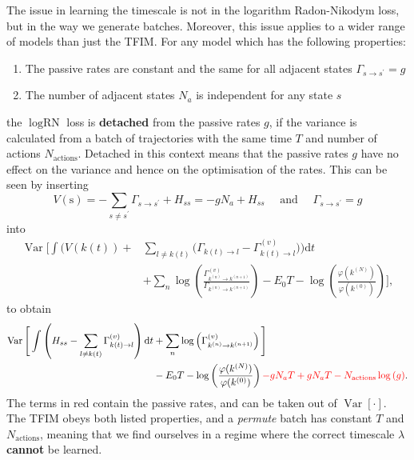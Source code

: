 The issue in learning the timescale is not in the logarithm Radon-Nikodym loss, but in the way we generate batches. Moreover, this issue applies to a wider range of models than just the TFIM. For any model which has the following properties:
\begin{enumerate}
	\item The passive rates are constant and the same for all adjacent states $\Gamma_{s \rightarrow s^{\prime}}=g$
	\item The number of adjacent states $N_a$ is independent for any state $s$
\end{enumerate}
the $\log \text{RN}$ loss is \textbf{detached} from the passive rates $g$, if the variance is calculated from a batch of trajectories with the same time $T$ and number of actions $N_{\text{actions}}$. Detached in this context means that the passive rates $g$ have no effect on the variance and hence on the optimisation of the rates. This can be seen by inserting 
\begin{equation}
	V(\mathrm{s})=-\sum_{s \neq s^{\prime}} \Gamma_{s \rightarrow s^{\prime}}+H_{s s}=-g N_a + H_{s s} \quad \text{ and } \quad \Gamma_{s \rightarrow s^{\prime}}=g
\end{equation}
into
\begin{equation}
	\begin{aligned}
			{\operatorname{Var}}\Bigg[\int\bigg(V(k(t))+&\sum_{l \neq k(t)}\bigg(\Gamma_{k(t) \rightarrow l}-\Gamma_{k(t) \rightarrow l}^{(v)}\bigg)\bigg) \mathrm{d} t \\
		&+\sum_{n} \log \left(\frac{\Gamma_{k^{(n)} \rightarrow k^{(n+1)}}^{(v)}}{\Gamma_{k^{(n)} \rightarrow k^{(n+1)}}}\right)-E_{0} T-\log \left(\frac{\varphi(k^{(N)})}{\varphi(k^{(0)})}\right)
		\Bigg],
	\end{aligned}
\end{equation}
to obtain
\begin{equation}
	\begin{aligned}
		\operatorname{Var}\Bigg[\int\left(H_{s s}-\sum_{l \neq k(t)}\Gamma_{k(t) \rightarrow l}^{(v)}\right)\mathrm{d} t 
		&+ \sum_{n} \log \left(\Gamma_{k^{(n)} \rightarrow k^{(n+1)}}^{(v)}\right)\Bigg] \\ &-E_{0} T -\log \left(\frac{\varphi(k^{(N)})}{\varphi(k^{(0)})}\right) \textcolor{red}{- gN_aT + gN_aT - N_{\text{actions}}\log{(g)}}.
	\end{aligned}
\end{equation}
The terms in red contain the passive rates, and can be taken out of $\operatorname{Var}[\cdot]$. The TFIM obeys both listed properties, and a \emph{permute} batch has constant $T$ and $N_{\text{actions}}$, meaning that we find ourselves in a regime where the correct timescale $\lambda$ \textbf{cannot} be learned. 

